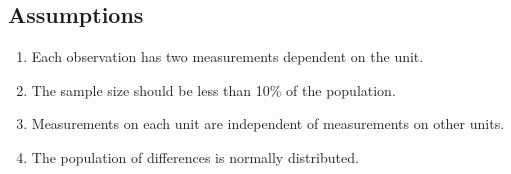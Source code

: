 \subsection{Assumptions}

\begin{assumptions}
\begin{enumerate}
\item Each observation has two measurements dependent on the unit.
\item The sample size should be less than 10\% of the population.
\item Measurements on each unit are independent of measurements on other units.
\item The population of differences is normally distributed.
\end{enumerate}
\end{assumptions}
